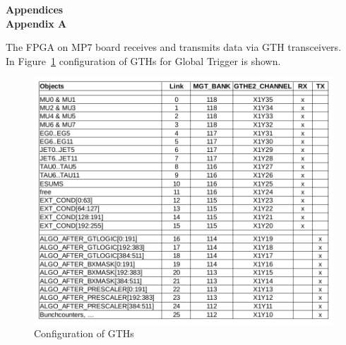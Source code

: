 \textbf{\LARGE Appendices}\\

\textbf{Appendix A}

The FPGA on MP7 board receives and transmits data via GTH transceivers.\\
In Figure~\ref{fig:app:gth_conf} configuration of GTHs for Global Trigger is shown.

\begin{figure}[htb]
\centering
\includegraphics[width=15cm]{figures/gth_xc7v690t_ffg1927}
\caption{Configuration of GTHs}
\label{fig:app:gth_conf}
\end{figure}

\clearpage
